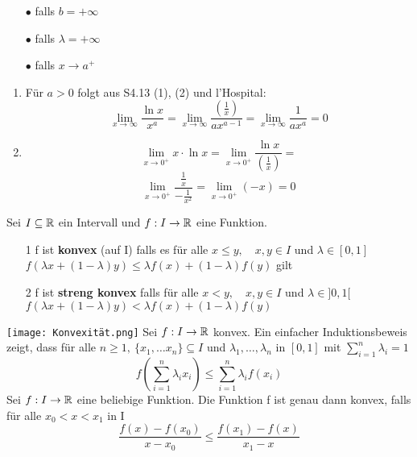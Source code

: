 \begin{enumerate}
    \item [$\bullet$] falls \(b = + \infty\)
    \item [$\bullet$] falls \( \lambda = + \infty\)
    \item [$\bullet$] falls \( x \rightarrow a^{+}\)
\end{enumerate}
\Bsp[4.25]
\begin{enumerate}
    \item Für \( a > 0\) folgt aus S4.13 (1), (2) und l'Hospital:
    \[ \lim_{x \rightarrow \infty} \frac{\ln x }{x^a} = \lim_{x \rightarrow \infty} \frac{\left( \frac{1}{x}\right)}{ax^{a-1}} = \lim_{x \rightarrow \infty} \frac{1}{ax^a} = 0\]
    \item \[ \lim_{x \rightarrow 0^+} x \cdot \ln x = \lim_{x \rightarrow 0^+} \frac{\ln x }{\left( \frac{1}{x}\right)} = \] 
    \[\lim_{x \rightarrow 0^+} \frac{\frac{1}{x}}{-\frac{1}{x^2}} = \lim_{x \rightarrow 0^+} (-x) = 0\]
\end{enumerate}
\Def[4.26] Sei \(I \subseteq \mathbb{R} \) ein Intervall und \(f: I \rightarrow \mathbb{R} \) eine Funktion.
\begin{enumerate}
    \item [1] f ist \textbf{konvex} (auf I) falls es für alle \newline \(x \leq y, \quad x,y \in I \) und \(\lambda \in [0,1]\) \newline
    \(f(\lambda x + (1 - \lambda)y) \leq \lambda f(x) + (1 - \lambda) f(y)\) gilt
    \item [2] f ist \textbf{streng konvex} falls für alle \newline \(x < y, \quad x,y \in I \) und \( \lambda \in ]0,1[\) \newline
    \(f(\lambda x + (1 - \lambda)y) < \lambda f(x) + (1 - \lambda)f(y)\)
\end{enumerate}
\texttt{[image: Konvexität.png]} \newline
{} Sei \(f : I \rightarrow \mathbb{R} \) konvex. Ein einfacher Induktionsbeweis zeigt, dass für alle \newline \(n \geq 1, \ \{x_1, \dots x_n \} \subseteq I \) und \(\lambda_1, \dots, \lambda_n\) in \([0,1]\) mit \(\sum_{i=1}^n \lambda_i = 1\)
\[f\left(\sum_{i=1}^n \lambda_i x_i\right) \leq \sum_{i=1}^n \lambda_i f(x_i)\]
\Lemma[4.28] Sei \(f : I \rightarrow \mathbb{R} \) eine beliebige Funktion. Die Funktion f ist genau dann konvex, falls für alle \(x_0 < x < x_1 \) in I
\[ \frac{f(x) - f(x_0)}{x - x_0} \leq \frac{f(x_1) - f(x)}{x_1 - x}\]
